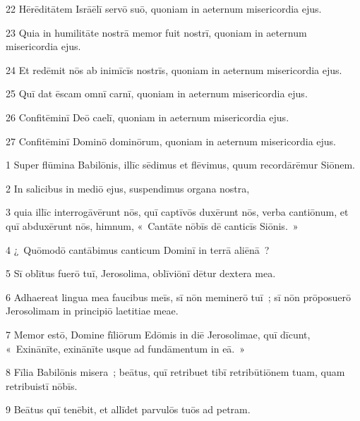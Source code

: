 \psalmVerse
  {\phantom{0}22}
  {Hērēditātem Isrāēlī servō suō, quoniam in aeternum misericordia ejus.}


\psalmVerse
  {\phantom{0}23}
  {Quia in humilitāte nostrā memor fuit nostrī, quoniam in aeternum misericordia ejus.}


\psalmVerse
  {\phantom{0}24}
  {Et redēmit nōs ab inimīcīs nostrīs, quoniam in aeternum misericordia ejus.}


\psalmVerse
  {\phantom{0}25}
  {Quī dat ēscam omnī carnī, quoniam in aeternum misericordia ejus.}


\psalmVerse
  {\phantom{0}26}
  {Confitēminī Deō caelī, quoniam in aeternum misericordia ejus.}


\psalmVerse
  {\phantom{0}27}
  {Confitēminī Dominō dominōrum, quoniam in aeternum misericordia ejus.}



\psalmVerse
  {\phantom{00}1}
  {Super flūmina Babilōnis, illīc sēdimus et flēvimus, quum recordārēmur Siōnem.}


\psalmVerse
  {\phantom{00}2}
  {In salicibus in mediō ejus, suspendimus organa nostra,}


\psalmVerse
  {\phantom{00}3}
  {quia illīc interrogāvērunt nōs, quī captīvōs duxērunt nōs, verba cantiōnum, et quī abduxērunt nōs, himnum, «~Cantāte nōbīs dē canticīs Siōnis.~»}


\psalmVerse
  {\phantom{00}4}
  {¿~Quōmodō cantābimus canticum Dominī in terrā aliēnā~?}


\psalmVerse
  {\phantom{00}5}
  {Sī oblītus fuerō tuī, Jerosolima, oblīviōnī dētur dextera mea.}


\psalmVerse
  {\phantom{00}6}
  {Adhaereat lingua mea faucibus meīs, sī nōn meminerō tuī~; sī nōn prōposuerō Jerosolimam in principiō laetitiae meae.}


\psalmVerse
  {\phantom{00}7}
  {Memor estō, Domine fīliōrum Edōmis in diē Jerosolimae, quī dīcunt, «~Exinānīte, exinānīte usque ad fundāmentum in eā.~»}


\psalmVerse
  {\phantom{00}8}
  {Fīlia Babilōnis misera~; beātus, quī retribuet tibī retribūtiōnem tuam, quam retribuistī nōbīs.}


\psalmVerse
  {\phantom{00}9}
  {Beātus quī tenēbit, et allīdet parvulōs tuōs ad petram.}




